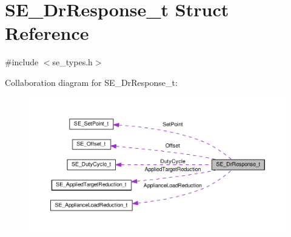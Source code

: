 \hypertarget{structSE__DrResponse__t}{}\section{S\+E\+\_\+\+Dr\+Response\+\_\+t Struct Reference}
\label{structSE__DrResponse__t}


{\ttfamily \#include $<$se\+\_\+types.\+h$>$}



Collaboration diagram for S\+E\+\_\+\+Dr\+Response\+\_\+t\+:\nopagebreak
\begin{figure}[H]
\begin{center}
\leavevmode
\includegraphics[width=350pt]{structSE__DrResponse__t__coll__graph}
\end{center}
\end{figure}
